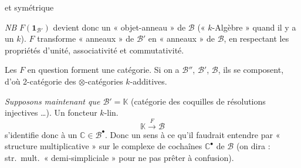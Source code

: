 \documentclass[11pt,a4paper]{article}
\begin{document}
et symétrique



\emph{NB} $F(\mathbf{1}_{\mathcal{B}'})$ devient donc un « objet-\struck{\ill{}}anneau »
de $\mathcal{B}$ (« $k$-Algèbre » quand il y a un $k$).
$F$ transforme « anneaux » de $\mathcal{B}'$ en « anneaux » de $\mathcal{B}$,
en respectant les propriétés d'unité, associativité et commutativité.

Les $F$ en question forment une catégorie. Si on a $\mathcal{B}''$,
$\mathcal{B}'$, $\mathcal{B}$, ils se composent, d'où
2-catégorie des $\otimes$-catégories $k$-additives.

\emph{Supposons maintenant que $\mathcal{B}' = \mathbb{K}$}
(catégorie des coquilles de   résolutions
injectives \ldots). Un foncteur $k$-lin.
\[
\mathbb{K} \xrightarrow{\ F\ } \mathcal{B}
\]
s'identifie donc à un $\mathbb{C} \in \mathcal{B}^{\bullet}$.
Donc un sens à ce qu'il faudrait entendre par « structure multiplicative »
sur le complexe de cochaînes $\mathbb{C}^{\bullet}$ de $\mathcal{B}$
(on dira : str.\ mult.\ « demi-simpliciale » pour ne pas prêter à
confusion).
\end{document}
